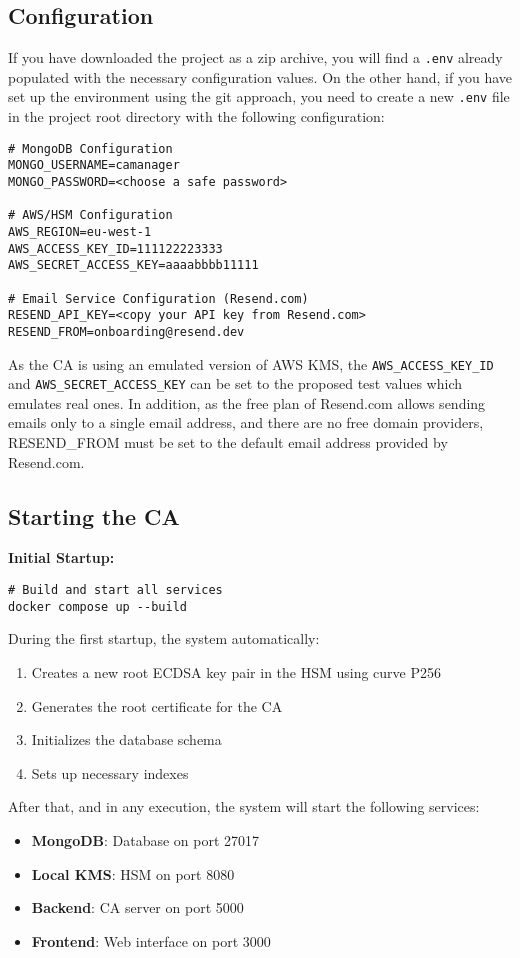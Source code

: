 \subsection{Configuration}
If you have downloaded the project as a zip archive, you will find a \texttt{.env} already populated
with the necessary configuration values.
On the other hand, if you have set up the environment using the git approach, you need to create a new
\texttt{.env} file in the project root directory with the following configuration:
\begin{verbatim}
# MongoDB Configuration
MONGO_USERNAME=camanager
MONGO_PASSWORD=<choose a safe password>

# AWS/HSM Configuration
AWS_REGION=eu-west-1
AWS_ACCESS_KEY_ID=111122223333
AWS_SECRET_ACCESS_KEY=aaaabbbb11111

# Email Service Configuration (Resend.com)
RESEND_API_KEY=<copy your API key from Resend.com>
RESEND_FROM=onboarding@resend.dev
\end{verbatim}
As the CA is using an emulated version of AWS KMS, the 
\texttt{AWS\_ACCESS\_KEY\_ID} and \texttt{AWS\_SECRET\_ACCESS\_KEY} can be set to the proposed 
test values which emulates real ones. In addition, as the free plan of Resend.com allows sending 
emails only to a single email address, and there are no free domain providers, RESEND\_FROM must be 
set to the default email address provided by Resend.com.

\subsection{Starting the CA}

\textbf{Initial Startup:}
\begin{verbatim}
# Build and start all services
docker compose up --build
\end{verbatim}
During the first startup, the system automatically:
\begin{enumerate}
    \item Creates a new root ECDSA key pair in the HSM using curve P256
    \item Generates the root certificate for the CA
    \item Initializes the database schema
    \item Sets up necessary indexes
\end{enumerate}
After that, and in any execution, the system will start the following services:
\begin{itemize}
    \item \textbf{MongoDB}: Database on port 27017
    \item \textbf{Local KMS}: HSM on port 8080
    \item \textbf{Backend}: CA server on port 5000
    \item \textbf{Frontend}: Web interface on port 3000
\end{itemize}

